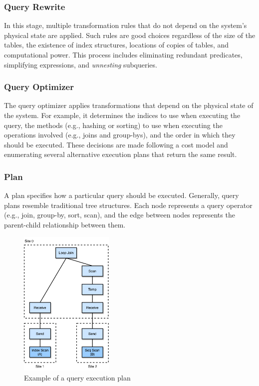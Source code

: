 \subsubsection{Query Rewrite}

In this stage, multiple transformation rules that do not depend on the system's physical state are applied. Such rules are good choices regardless of the size of the tables, the existence of index structures, locations of copies of tables, and computational power. This process includes eliminating redundant predicates, simplifying expressions, and \textit{unnesting} subqueries. %

\subsubsection{Query Optimizer}

The query optimizer applies transformations that depend on the physical state of the system. For example, it determines the indices to use when executing the query, the methods (e.g., hashing or sorting) to use when executing the operations involved (e.g., joins and group-bys), and the order in which they should be executed. %
These decisions are made following a cost model and enumerating several alternative execution plans that return the same result.

\subsubsection{Plan}

A plan specifies how a particular query should be executed. Generally, query plans resemble traditional tree structures. Each node represents a query operator (e.g., join, group-by, sort, scan), and the edge between nodes represents the parent-child relationship between them. %

\begin{figure}[ht]
\centering
\includegraphics[width=0.4\textwidth]{img/state_of_the_art/execution_plan.png}
\caption{Example of a query execution plan \citep{Kossmann2000}}
\label{fig:execution_plan}
\end{figure}

